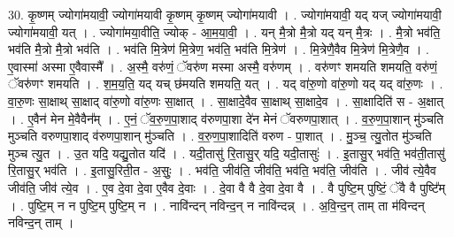 \documentclass[17pt]{extarticle}
\begin{document}
30. कृ॒ष्णम् ज्योगा॑मयावी॒ ज्योगा॑मयावी कृ॒ष्णम् कृ॒ष्णम् ज्योगा॑मयावी । . ज्योगा॑मयावी॒ यद् यज् ज्योगा॑मयावी॒ ज्योगा॑मयावी॒ यत् । . ज्योगा॑मया॒वीति॒ ज्योक् - आ॒म॒या॒वी॒ । . यन् मै॒त्रो मै॒त्रो यद् यन् मै॒त्रः । . मै॒त्रो भव॑ति॒ भव॑ति मै॒त्रो मै॒त्रो भव॑ति । . भव॑ति मि॒त्रेण॑ मि॒त्रेण॒ भव॑ति॒ भव॑ति मि॒त्रेण॑ । . मि॒त्रेणै॒वैव मि॒त्रेण॑ मि॒त्रेणै॒व । . ए॒वास्मा॑ अस्मा ए॒वैवास्मै᳚ । . अ॒स्मै॒ वरु॑णं॒ ॅवरु॑ण मस्मा अस्मै॒ वरु॑णम् । . वरु॑णꣳ शमयति शमयति॒ वरु॑णं॒ ॅवरु॑णꣳ शमयति । . श॒म॒य॒ति॒ यद् यच् छ॑मयति शमयति॒ यत् । . यद् वा॑रु॒णो वा॑रु॒णो यद् यद् वा॑रु॒णः । . वा॒रु॒णः सा॒क्षाथ् सा॒क्षाद् वा॑रु॒णो वा॑रु॒णः सा॒क्षात् । . सा॒क्षादे॒वैव सा॒क्षाथ् सा॒क्षादे॒व । . सा॒क्षादिति॑ स - अ॒क्षात् । . ए॒वैन॑ मेन मे॒वैवैन᳚म् । . ए॒नं॒ ॅव॒रु॒ण॒पा॒शाद् व॑रुणपा॒शा दे॑न मेनं ॅवरुणपा॒शात् । . व॒रु॒ण॒पा॒शान् मु॑ञ्चति मुञ्चति वरुणपा॒शाद् व॑रुणपा॒शान् मु॑ञ्चति । . व॒रु॒ण॒पा॒शादिति॑ वरुण - पा॒शात् । . मु॒ञ्च॒ त्यु॒तोत मु॑ञ्चति मुञ्च त्यु॒त । . उ॒त यदि॒ यद्यु॒तोत यदि॑ । . यदी॒तासु॑ रि॒तासु॒र् यदि॒ यदी॒तासुः॑ । . इ॒तासु॒र् भव॑ति॒ भव॑ती॒तासु॑ रि॒तासु॒र् भव॑ति । . इ॒तासु॒रिती॒त - अ॒सुः॒ । . भव॑ति॒ जीव॑ति॒ जीव॑ति॒ भव॑ति॒ भव॑ति॒ जीव॑ति । . जीव॑ त्ये॒वैव जीव॑ति॒ जीव॑ त्ये॒व । . ए॒व दे॒वा दे॒वा ए॒वैव दे॒वाः । . दे॒वा वै वै दे॒वा दे॒वा वै । . वै पुष्टि॒म् पुष्टिं॒ ॅवै वै पुष्टि᳚म् । . पुष्टि॒म् न न पुष्टि॒म् पुष्टि॒म् न । . नावि॑न्दन् नविन्द॒न् न नावि॑न्दन्न् । . अ॒वि॒न्द॒न् ताम् ता म॑विन्दन् नविन्द॒न् ताम् । \newline
\end{document}
